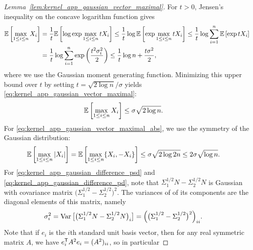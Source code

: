 \begin{proof}[Lemma~\ref{lem:kernel_app_gaussian_vector_maximal}]

  For $t > 0$,
  Jensen's inequality on the concave logarithm function
  gives
  \begin{align*}
    \mathbb{E}\left[
      \max_{1 \leq i \leq n}
      X_i
    \right]
    &=
    \frac{1}{t}
    \mathbb{E}\left[
      \log
      \exp
      \max_{1 \leq i \leq n}
      t X_i
    \right]
    \leq
    \frac{1}{t}
    \log
    \mathbb{E}\left[
      \exp
      \max_{1 \leq i \leq n}
      t X_i
    \right]
    \leq
    \frac{1}{t}
    \log
    \sum_{i=1}^n
    \mathbb{E}\left[
      \exp
      t X_i
    \right] \\
    &=
    \frac{1}{t}
    \log
    \sum_{i=1}^n
    \exp
    \left(
      \frac{t^2 \sigma_i^2}{2}
    \right)
    \leq
    \frac{1}{t}
    \log n
    + \frac{t \sigma^2}{2},
  \end{align*}
  where we use the Gaussian moment generating function.
  Minimizing this upper bound over $t$
  by setting $t = \sqrt{2 \log n} / \sigma$
  yields \eqref{eq:kernel_app_gaussian_vector_maximal}:
  \begin{align*}
    \mathbb{E}\left[
      \max_{1 \leq i \leq n}
      X_i
    \right]
    &\leq
    \sigma \sqrt{2 \log n}.
  \end{align*}
  For \eqref{eq:kernel_app_gaussian_vector_maximal_abs},
  we use the symmetry of the Gaussian distribution:
  \begin{align*}
    \mathbb{E}\left[
      \max_{1 \leq i \leq n}
      |X_i|
    \right]
    &=
    \mathbb{E}\left[
      \max_{1 \leq i \leq n}
      \{X_i, -X_i\}
    \right]
    \leq
    \sigma \sqrt{2 \log 2n}
    \leq
    2 \sigma \sqrt{\log n}.
  \end{align*}
  For \eqref{eq:kernel_app_gaussian_difference_psd}
  and \eqref{eq:kernel_app_gaussian_difference_pd},
  note that
  $\Sigma_1^{1/2} N - \Sigma_2^{1/2} N$
  is Gaussian with covariance matrix
  $\big(\Sigma_1^{1/2} - \Sigma_2^{1/2}\big)^2$.
  The variances of of its components are the diagonal
  elements of this matrix, namely
  \begin{align*}
    \sigma_i^2
    &=
    \operatorname{Var}\big[
      \big(\Sigma_1^{1/2} N - \Sigma_2^{1/2} N\big)_i
    \big]
    =
    \Big(\big(
        \Sigma_1^{1/2} - \Sigma_2^{1/2}
    \big)^2\Big)_{ii}.
  \end{align*}
  Note that if $e_i$ is the
  $i$th standard unit basis vector,
  then for any real symmetric matrix $A$,
  we have
  $e_i^{\mathsf{T}} A^2 e_i = (A^2)_{ii}$,
  so in particular

\end{proof}
